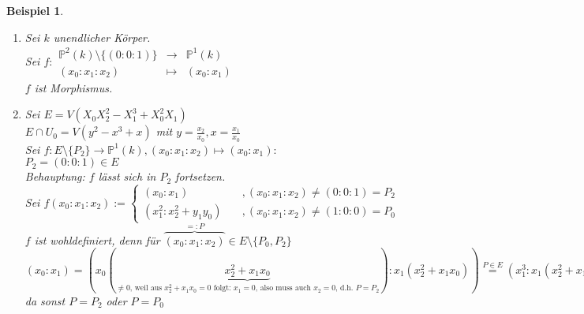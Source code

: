 \documentclass[a4paper,12pt]{report}
\theoremstyle{break}
\newtheorem{Bsp}[Def]{Beispiel}
\theoremstyle{nonumberbreak}
\theoremstyle{nonumberplain}
\newcommand{\IP}{\mathbb{P}}%
\begin{document}
\begin{Bsp}\begin{enumerate}[1)]
\item
	Sei $k$ unendlicher K\"orper.\\
	Sei $f:\begin{array}{rcl}\IP^2(k)\setminus\{(0:0:1)\} &\to& \IP^1(k)\\ (x_0:x_1:x_2) &\mapsto& (x_0:x_1)\end{array}$\\
	$f$ ist Morphismus.
\item
	Sei $E=V(X_0X_2^2-X_1^3+X_0^2X_1)$\\
	$E\cap U_0=V(y^2-x^3+x)$ mit $y=\frac{x_2}{x_0}, x=\frac{x_1}{x_0}$\\
	Sei $f:E\setminus\{P_2\}\to\IP^1(k), (x_0:x_1:x_2)\mapsto(x_0:x_1):$\\
	$P_2=(0:0:1)\in E$\\
	\emph{Behauptung}: $f$ l\"asst sich in $P_2$ fortsetzen.\\
	Sei $f(x_0:x_1:x_2):=\left\{\begin{array}{ll}
		(x_0:x_1) & \quad ,(x_0:x_1:x_2)\not=(0:0:1)=P_2\\
		(x_1^2:x_2^2+y_1y_0) & \quad ,(x_0:x_1:x_2)\not=(1:0:0)=P_0\end{array}\right.$\\
	$f$ ist wohldefiniert, denn f\"ur $\overbrace{(x_0:x_1:x_2)}^{=:P}\in E\setminus\{P_0,P_2\}$\\
	$(x_0:x_1)=(x_0(\underbrace{x_2^2+x_1x_0}_{\ne0\text{, weil aus }x_2^2+x_1x_0=0 \text{ folgt: }x_1=0\text{, also muss auch }x_2=0\text{, d.h. }P=P_2}):x_1(x_2^2+x_1x_0))\overset{P\in E}{=}(x_1^3:x_1(x_2^2+x_1x_0))=(x_1^2:x_2^2+x_1x_0), x_1\ne0$ da sonst $P=P_2$ oder $P=P_0$
\end{enumerate}\end{Bsp}
\end{document}
